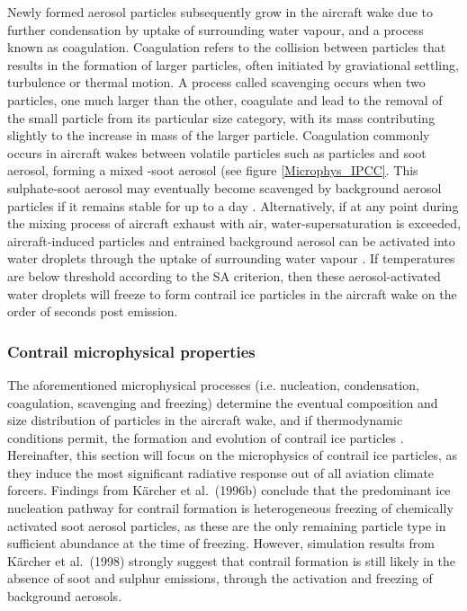 Newly formed aerosol particles subsequently grow in the aircraft wake due to further condensation by uptake of surrounding water vapour, and a process known as coagulation. Coagulation refers to the collision between particles that results in the formation of larger particles, often initiated by graviational settling, turbulence or thermal motion. A process called scavenging occurs when two particles, one much larger than the other, coagulate and lead to the removal of the small particle from its particular size category, with its mass contributing slightly to the increase in mass of the larger particle. Coagulation commonly occurs in aircraft wakes between volatile particles such as  particles and soot aerosol, forming a mixed -soot aerosol (see figure \ref{Microphys_IPCC}. This sulphate-soot aerosol may eventually become scavenged by background aerosol particles if it remains stable for up to a day \cite{IPCC1999}. Alternatively, if at any point during the mixing process of aircraft exhaust with air, water-supersaturation is exceeded, aircraft-induced particles and entrained background aerosol can be activated into water droplets through the uptake of surrounding water vapour \cite{Karcher2018}. If temperatures are below threshold according to the SA criterion, then these aerosol-activated water droplets will freeze to form contrail ice particles in the aircraft wake on the order of seconds post emission. 

\subsubsection{Contrail microphysical properties}
The aforementioned microphysical processes (i.e. nucleation, condensation, coagulation, scavenging and freezing) determine the eventual composition and size distribution of particles in the aircraft wake, and if thermodynamic conditions permit, the formation and evolution of contrail ice particles \cite{AIR5715, Karcher2015}. Hereinafter, this section will focus on the microphysics of contrail ice particles, as they induce the most significant radiative response out of all aviation climate forcers. Findings from K{\"a}rcher et al.\ (1996b) \cite{Karcher1996b} conclude that the predominant ice nucleation pathway for contrail formation is heterogeneous freezing of chemically activated soot aerosol particles, as these are the only remaining particle type in sufficient abundance at the time of freezing. However, simulation results from K{\"a}rcher et al.\ (1998) \cite{Karcher1998} strongly suggest that contrail formation is still likely in the absence of soot and sulphur emissions, through the activation and freezing of background aerosols. 

